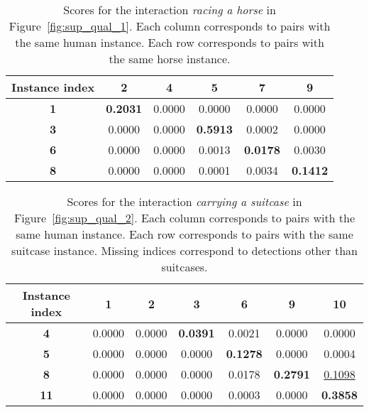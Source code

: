 \documentclass[10pt,twocolumn,letterpaper]{article}
\begin{document}
 \begin{table}[h!]\small
	\caption{Scores for the interaction \textit{racing a horse} in Figure~\ref{fig:sup_qual_1}. Each column corresponds to pairs with the same human instance. Each row corresponds to pairs with the same horse instance.}
	\label{tab:sup_qual_1}
\setlength{\tabcolsep}{2pt} \begin{tabularx}{\linewidth}{c | C C C C C}
		 \toprule
	   Instance index & \textbf{2} & \textbf{4} & \textbf{5} & \textbf{7} & \textbf{9} \\
	   \midrule
		 \textbf{1} & \textbf{0.2031} & 0.0000 & 0.0000 & 0.0000 & 0.0000 \\
		 \textbf{3} & 0.0000 & 0.0000 & \textbf{0.5913} & 0.0002 & 0.0000 \\
		 \textbf{6} & 0.0000 & 0.0000 & 0.0013 & \textbf{0.0178} & 0.0030 \\
		 \textbf{8} & 0.0000 & 0.0000 & 0.0001 & 0.0034 & \textbf{0.1412} \\
		 \bottomrule
	 \end{tabularx}
 \end{table}

 \begin{table}[h!]\small
	\caption{Scores for the interaction \textit{carrying a suitcase} in Figure~\ref{fig:sup_qual_2}. Each column corresponds to pairs with the same human instance. Each row corresponds to pairs with the same suitcase instance. Missing indices correspond to detections other than suitcases.}
	\label{tab:sup_qual_2}
\setlength{\tabcolsep}{2pt} \begin{tabularx}{\linewidth}{c | C C C C C C}
		 \toprule
	   Instance index & \textbf{1} & \textbf{2} & \textbf{3} & \textbf{6} & \textbf{9}  & \textbf{10} \\
	   \midrule
		 \textbf{4} & 0.0000 & 0.0000 & \textbf{0.0391} & 0.0021 & 0.0000 & 0.0000 \\
		 \textbf{5} & 0.0000 & 0.0000 & 0.0000 & \textbf{0.1278} & 0.0000 & 0.0004 \\
		 \textbf{8} & 0.0000 & 0.0000 & 0.0000 & 0.0178 & \textbf{0.2791} & \underline{0.1098} \\
		 \textbf{11} & 0.0000 & 0.0000 & 0.0000 & 0.0003 & 0.0000 & \textbf{0.3858} \\
		 \bottomrule
	 \end{tabularx}
 \end{table}
\end{document}
